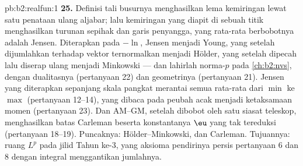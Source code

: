 \begin{solution}{pb:b2:realfun:1}
\textbf{25.} Definisi tali busurnya menghasilkan lema kemiringan lewat
satu penataan ulang aljabar; lalu kemiringan yang diapit di sebuah titik
menghasilkan turunan sepihak dan garis penyangga, yang rata-rata
berbobotnya adalah Jensen. Diterapkan pada $-\ln$, Jensen menjadi Young,
yang setelah dijumlahkan terhadap vektor ternormalkan menjadi Hölder,
yang setelah dipecah lalu diserap ulang menjadi Minkowski --- dan
lahirlah norma-$p$ pada \cref{ch:b2:nvs},  dengan dualitasnya
(pertanyaan 22) dan geometrinya (pertanyaan 21). Jensen yang diterapkan
sepanjang skala pangkat merantai semua rata-rata dari $\min$ ke $\max$
(pertanyaan 12--14), yang dibaca pada peubah acak menjadi
ketaksamaan momen (pertanyaan 23). Dan AM--GM, setelah dibobot oleh satu
siasat teleskop, menghasilkan batas Carleman beserta konstantanya $\eu$
yang tak tereduksi (pertanyaan 18--19). Puncaknya:
Hölder--Minkowski, dan Carleman. Tujuannya: ruang $L^p$
pada jilid Tahun ke-3, yang aksioma pendirinya persis
pertanyaan 6 dan 8 dengan integral menggantikan jumlahnya.

\end{solution}
